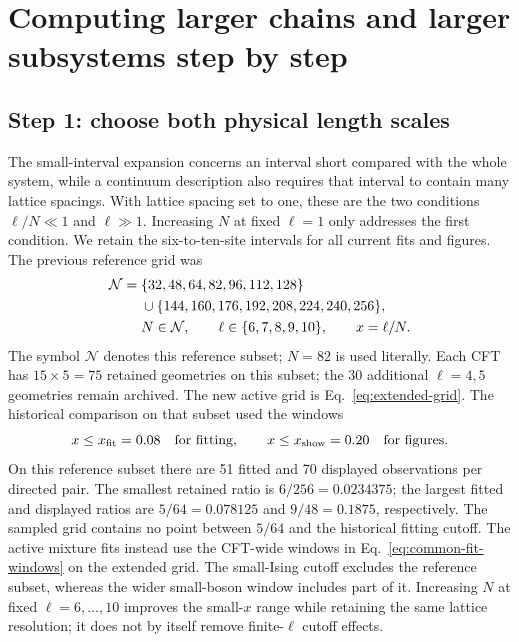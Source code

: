 \clearpage
\section{Computing larger chains and larger subsystems step by step}
\label{sec:extension}
\subsection{Step 1: choose both physical length scales}
\label{sec:large-scales}
The small-interval expansion concerns an interval short compared with the
whole system, while a continuum description also requires that interval
to contain many lattice spacings. With lattice spacing set to one, these
are the two conditions $\ell/N\ll1$ and $\ell\gg1$. Increasing $N$ at
fixed $\ell=1$ only addresses the first condition. We retain the
six-to-ten-site intervals for all current fits and figures. The previous reference grid was
\begin{align}
 \mathcal N={}&\{32,48,64,82,96,112,128\}\notag\\
 &{}\cup\{144,160,176,192,208,224,240,256\},\notag\\
 &N\in\mathcal N,\qquad \ell\in\{6,7,8,9,10\},\qquad x=\ell/N.
 \label{eq:large-grid}
\end{align}
The symbol $\mathcal N$ denotes this reference subset;
$N=82$ is used literally. Each CFT has $15\times5=75$ retained geometries on this subset; the 30 additional $\ell=4,5$ geometries remain archived. The new active grid is Eq.~\eqref{eq:extended-grid}.
The historical comparison on that subset used the windows
\begin{equation}
 x\leq x_{\rm fit}=0.08\quad\hbox{for fitting},\qquad
 x\leq x_{\rm show}=0.20\quad\hbox{for figures}.
 \label{eq:fit-display-windows}
\end{equation}
On this reference subset there are 51 fitted and 70 displayed observations per directed pair.
The smallest retained ratio is $6/256=0.0234375$; the largest fitted and
displayed ratios are $5/64=0.078125$ and $9/48=0.1875$,
respectively. The sampled grid contains no point between $5/64$ and
the historical fitting cutoff. The active mixture fits instead use
the CFT-wide windows in Eq.~\eqref{eq:common-fit-windows} on the
extended grid. The small-Ising cutoff excludes the reference subset,
whereas the wider small-boson window includes part of it. Increasing $N$ at fixed $\ell=6,\ldots,10$
improves the small-$x$ range while retaining the same lattice resolution;
it does not by itself remove finite-$\ell$ cutoff effects.

